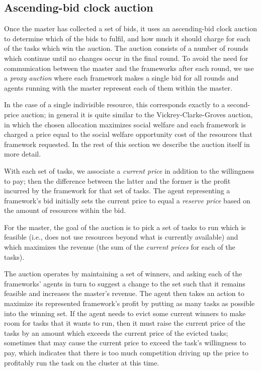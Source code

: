 \documentclass{acm_proc_article-sp}
\begin{document}
\subsection{Ascending-bid clock auction}
Once the master has collected a set of bids, it uses an ascending-bid clock
auction to determine which of the bids to fulfil, and how much it should charge
for each of the tasks which win the auction. The auction consists of a number of
rounds which continue until no changes occur in the final round. To avoid the
need for communication between the master and the frameworks after each round,
we use a \emph{proxy auction} where each framework makes a single bid for all
rounds and agents running with the master represent each of them within the
master.

In the case of a single indivisible resource, this corresponds exactly
to a second-price auction; in general it is quite similar
to the Vickrey-Clarke-Groves auction, in which the chosen allocation
maximizes social welfare and each framework is charged a price
equal to the social welfare opportunity cost of the resources
that framework requested. In the rest of this section we describe the auction
itself in more detail.

With each set of tasks, we associate a \emph{current price} in addition to the
willingness to pay; then the difference between the latter and the former is the
profit incurred by the framework for that set of tasks. The agent representing a
framework's bid initially sets the current price to equal a \emph{reserve price}
based on the amount of resources within the bid.

For the master, the goal of the auction is to pick a set of tasks to run which
is feasible (i.e., does not use resources beyond what is currently available) and
which maximizes the revenue (the sum of the \emph{current prices} for each of the
tasks).

The auction operates by maintaining a set of winners, and asking each of
the frameworks' agents in turn to suggest a change to the set such that it
remains feasible and increases the master's revenue. The agent then takes an
action to maximize its represented framework's profit by putting as many tasks
as possible into the winning set. If the agent needs to evict some current
winners to make room for tasks that it wants to run, then it must raise the
current price of the tasks by an amount which exceeds the current price of the
evicted tasks; sometimes that may cause the current price to exceed the task's
willingness to pay, which indicates that there is too much competition driving
up the price to profitably run the task on the cluster at this time.
\end{document}
